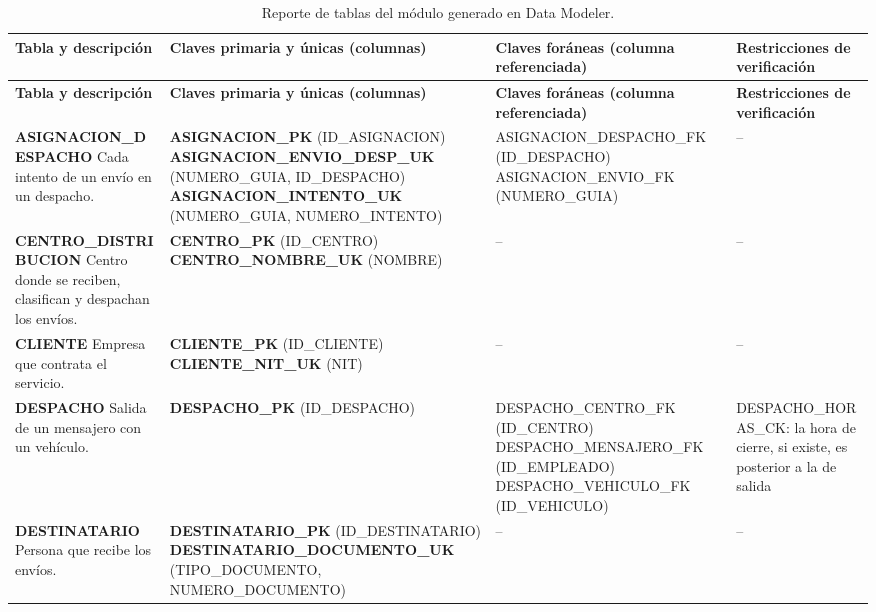 {\scriptsize
\begin{longtable}{|L{3.0cm}|L{3.9cm}|L{3.8cm}|L{3.6cm}|}
\caption{Reporte de tablas del módulo generado en Data Modeler.}
\label{tab:dmdiccionario}\\
\hline
\textbf{Tabla y descripción} & \textbf{Claves primaria y únicas (columnas)} & \textbf{Claves foráneas (columna referenciada)} & \textbf{Restricciones de verificación} \\ \hline
\endfirsthead
\hline
\textbf{Tabla y descripción} & \textbf{Claves primaria y únicas (columnas)} & \textbf{Claves foráneas (columna referenciada)} & \textbf{Restricciones de verificación} \\ \hline
\endhead
\textbf{ASIGNACION\_DESPACHO} \newline Cada intento de un envío en un despacho. & \textbf{ASIGNACION\_PK} (ID\_ASIGNACION) \newline \textbf{ASIGNACION\_ENVIO\_DESP\_UK} (NUMERO\_GUIA, ID\_DESPACHO) \newline \textbf{ASIGNACION\_INTENTO\_UK} (NUMERO\_GUIA, NUMERO\_INTENTO) & ASIGNACION\_DESPACHO\_FK (ID\_DESPACHO) \newline ASIGNACION\_ENVIO\_FK (NUMERO\_GUIA) & -- \\ \hline
\textbf{CENTRO\_DISTRIBUCION} \newline Centro donde se reciben, clasifican y despachan los envíos. & \textbf{CENTRO\_PK} (ID\_CENTRO) \newline \textbf{CENTRO\_NOMBRE\_UK} (NOMBRE) & -- & -- \\ \hline
\textbf{CLIENTE} \newline Empresa que contrata el servicio. & \textbf{CLIENTE\_PK} (ID\_CLIENTE) \newline \textbf{CLIENTE\_NIT\_UK} (NIT) & -- & -- \\ \hline
\textbf{DESPACHO} \newline Salida de un mensajero con un vehículo. & \textbf{DESPACHO\_PK} (ID\_DESPACHO) & DESPACHO\_CENTRO\_FK (ID\_CENTRO) \newline DESPACHO\_MENSAJERO\_FK (ID\_EMPLEADO) \newline DESPACHO\_VEHICULO\_FK (ID\_VEHICULO) & DESPACHO\_HORAS\_CK: la hora de cierre, si existe, es posterior a la de salida \\ \hline
\textbf{DESTINATARIO} \newline Persona que recibe los envíos. & \textbf{DESTINATARIO\_PK} (ID\_DESTINATARIO) \newline \textbf{DESTINATARIO\_DOCUMENTO\_UK} (TIPO\_DOCUMENTO, NUMERO\_DOCUMENTO) & -- & -- \\ \hline

\end{longtable}}
